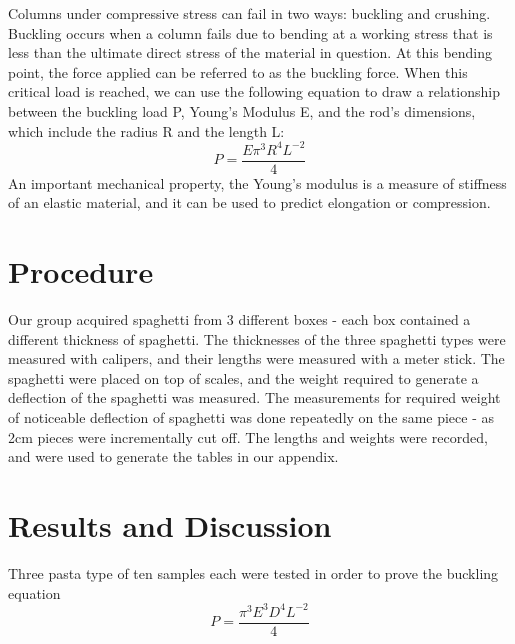 \documentclass[12pt]{article}
\newcommand\tab[1][1.5cm]{\hspace*{#1}}
\begin{document}
\tab Columns under compressive stress can fail in two ways: buckling and crushing. Buckling occurs when a column fails due to bending at a working stress that is less than the ultimate direct stress of the material in question. At this bending point, the force applied can be referred to as the buckling force. When this critical load is reached, we can use the following equation to draw a relationship between the buckling load P, Young’s Modulus E, and the rod’s dimensions, which include the radius R and the length L:
$$P = \frac{E\pi^3R^4L^{-2}}{4}$$
\tab An important mechanical property, the Young's modulus is a measure of stiffness of an elastic material, and it can be used to predict elongation or compression.

\section{Procedure}

\tab Our group acquired spaghetti from 3 different boxes - each box contained a different thickness of spaghetti. The thicknesses of the three spaghetti types were measured with calipers, and their lengths were measured with a meter stick. The spaghetti were placed on top of scales, and the weight required to generate a deflection of the spaghetti was measured. The measurements for required weight of noticeable deflection of spaghetti was done repeatedly on the same piece - as 2cm pieces were incrementally cut off. The lengths and weights were recorded, and were used to generate the tables in our appendix.

\section{Results and Discussion}

\tab Three pasta type of ten samples each were tested in order to prove the buckling equation
\begin{equation}
P=\frac{\pi ^3E^3D^4L^{-2}}{4}
\end{equation}
\end{document}
